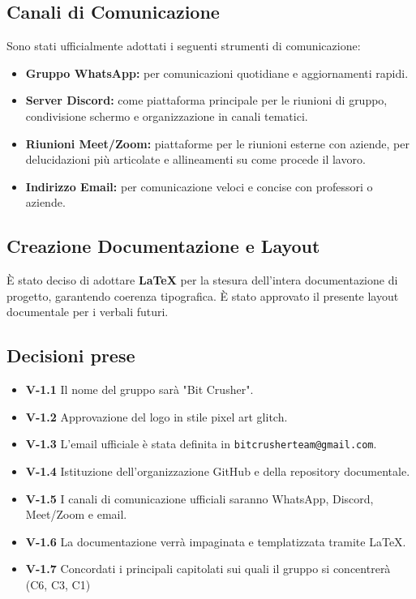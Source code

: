 \documentclass[a4paper, 11pt]{article}
\begin{document}
\subsection{Canali di Comunicazione}
Sono stati ufficialmente adottati i seguenti strumenti di comunicazione:
\begin{itemize}
    \item \textbf{Gruppo WhatsApp:} per comunicazioni quotidiane e aggiornamenti rapidi.
    \item \textbf{Server Discord:} come piattaforma principale per le riunioni di gruppo, condivisione schermo e organizzazione in canali tematici.
    \item \textbf{Riunioni Meet/Zoom:} piattaforme per le riunioni esterne con aziende, per delucidazioni più articolate e allineamenti su come procede il lavoro.
    \item \textbf{Indirizzo Email:} per comunicazione veloci e concise con professori o aziende.
\end{itemize}

\subsection{Creazione Documentazione e Layout}
È stato deciso di adottare \textbf{LaTeX} per la stesura dell'intera documentazione di progetto, garantendo coerenza tipografica. È stato approvato il presente layout documentale per i verbali futuri.

\subsection{Decisioni prese}
\begin{itemize}
    \item \textbf{V-1.1} Il nome del gruppo sarà "Bit Crusher".
    \item \textbf{V-1.2} Approvazione del logo in stile pixel art glitch.
    \item \textbf{V-1.3} L'email ufficiale è stata definita in \texttt{bitcrusherteam@gmail.com}.
    \item \textbf{V-1.4} Istituzione dell'organizzazione GitHub e della repository documentale.
    \item \textbf{V-1.5} I canali di comunicazione ufficiali saranno WhatsApp, Discord, Meet/Zoom e email.
    \item \textbf{V-1.6} La documentazione verrà impaginata e templatizzata tramite LaTeX.
    \item \textbf{V-1.7} Concordati i principali capitolati sui quali il gruppo si concentrerà (C6, C3, C1)
\end{itemize}
\end{document}
